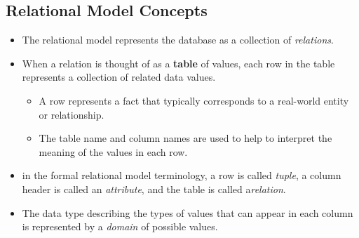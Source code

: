 \documentclass[10pt]{article}
\begin{document}
\subsection{Relational Model Concepts}

\begin{itemize}
	\item The relational model represents the database as a collection of \textit{relations}.
	\item When a relation is thought of as a \textbf{table} of values, each row in the table represents a collection of related data values.
	\begin{itemize}
		\item A row represents a fact that typically corresponds to a real-world entity or relationship.
		\item The table name and column names are used to help to interpret the meaning of the values in each row.
	\end{itemize}
	\item in the formal relational model terminology, a row is called \textit{tuple}, a column header is called an \textit{attribute}, and the table is called a\textit{relation}.
	\item The data type describing the types of values that can appear in each column is represented by a \textit{domain} of possible values.
\end{itemize}  
\end{document}
